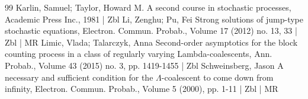 \begin{thebibliography}{99}
 Karlin, Samuel; Taylor, Howard M. A second course in stochastic processes, Academic Press Inc., 1981 | Zbl
 Li, Zenghu; Pu, Fei Strong solutions of jump-type stochastic equations, Electron. Commun. Probab., Volume 17 (2012) no. 13, 33 | Zbl | MR
 Limic, Vlada; Talarczyk, Anna Second-order asymptotics for the block counting process in a class of regularly varying Lambda-coalescents, Ann. Probab., Volume 43 (2015) no. 3, pp. 1419-1455 | Zbl
 Schweinsberg, Jason A necessary and sufficient condition for the $\Lambda $-coalescent to come down from infinity, Electron. Commun. Probab., Volume 5 (2000), pp. 1-11 | Zbl | MR
\end{thebibliography}
